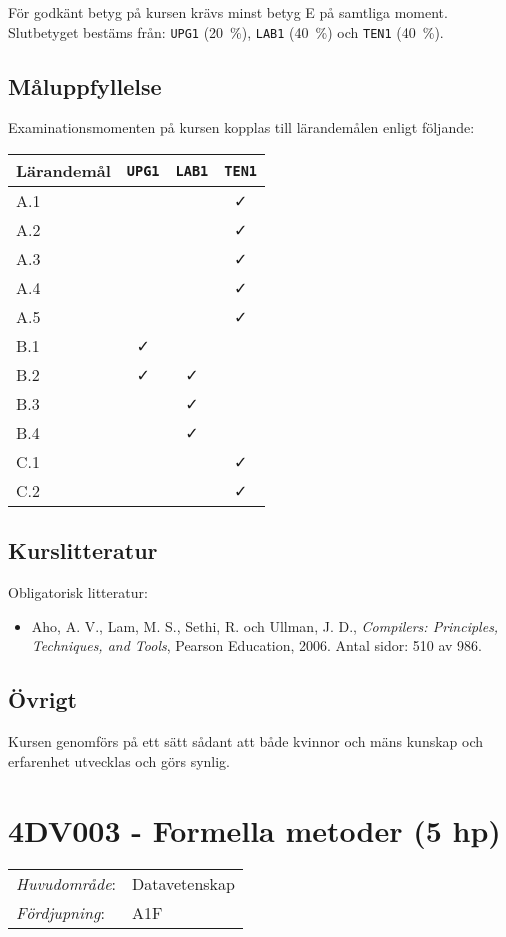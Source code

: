 För godkänt betyg på kursen krävs minst betyg E på samtliga moment.
Slutbetyget bestäms från: \texttt{UPG1} (20~\%), \texttt{LAB1} (40~\%) och \texttt{TEN1} (40~\%).

\subsection*{Måluppfyllelse}

Examinationsmomenten på kursen kopplas till lärandemålen enligt
följande:

\begin{longtable}[]{@{}lccc@{}}
\toprule
\textsf{Lärandemål} & \texttt{UPG1} & \texttt{LAB1} & \texttt{TEN1}\tabularnewline
\midrule
\endhead
A.1 & & & \faCheck\tabularnewline
A.2 & & & \faCheck\tabularnewline
A.3 & & & \faCheck\tabularnewline
A.4 & & & \faCheck\tabularnewline
A.5 & & & \faCheck\tabularnewline
B.1 & \faCheck & &\tabularnewline
B.2 & \faCheck & \faCheck &\tabularnewline
B.3 & & \faCheck &\tabularnewline
B.4 & & \faCheck &\tabularnewline
C.1 & & & \faCheck\tabularnewline
C.2 & & & \faCheck\tabularnewline
\bottomrule
\end{longtable}

\subsection*{Kurslitteratur}

Obligatorisk litteratur:

\begin{itemize}
\tightlist
\item
  Aho, A. V., Lam, M. S., Sethi, R. och Ullman, J. D., \emph{Compilers:
  Principles, Techniques, and Tools}, Pearson Education, 2006. Antal
  sidor: 510 av 986.
\end{itemize}

\subsection*{Övrigt}

Kursen genomförs på ett sätt sådant att både kvinnor och mäns kunskap och erfarenhet utvecklas och görs synlig.
\pagebreak
\section*{4DV003 - Formella metoder (5 hp)}

\begin{tabular}{ll}\emph{Huvudområde}: & Datavetenskap\tabularnewline\emph{Fördjupning}: & A1F\tabularnewline\end{tabular}

